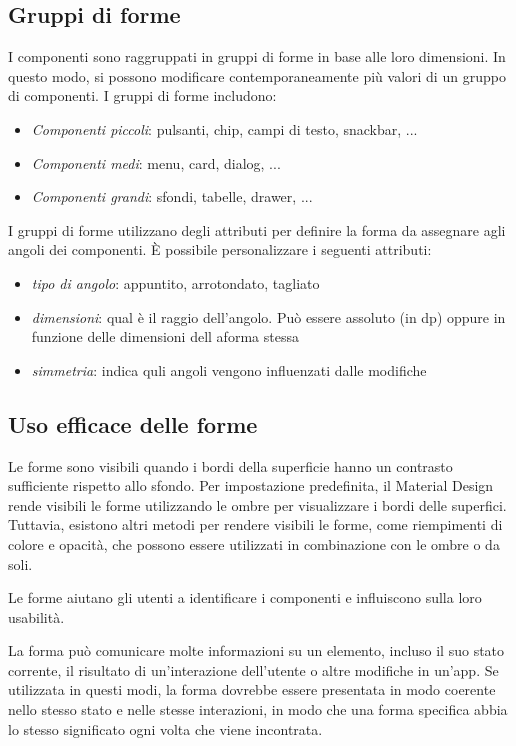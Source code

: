 \documentclass[12pt, a4paper]{report}
\begin{document}
	\subsection{Gruppi di forme}
	I componenti sono raggruppati in gruppi di forme in base alle loro dimensioni. In questo modo, si possono modificare contemporaneamente più valori di un gruppo di componenti. I gruppi di forme includono:
	\begin{itemize}
		\item \textit{Componenti piccoli}: pulsanti, chip, campi di testo, snackbar, ...
		\item \textit{Componenti medi}: menu, card, dialog, ...
		\item \textit{Componenti grandi}: sfondi, tabelle, drawer, ...
	\end{itemize}
	
	I gruppi di forme utilizzano degli attributi per definire la forma da assegnare agli angoli dei componenti. È possibile personalizzare i seguenti attributi:
	\begin{itemize}
		\item \textit{tipo di angolo}: appuntito, arrotondato, tagliato
		\item \textit{dimensioni}: qual è il raggio dell'angolo. Può essere assoluto (in dp) oppure in funzione delle dimensioni dell aforma stessa
		\item \textit{simmetria}: indica quli angoli vengono influenzati dalle modifiche
	\end{itemize}

	\subsection{Uso efficace delle forme}
	Le forme sono visibili quando i bordi della superficie hanno un contrasto sufficiente rispetto allo sfondo. Per impostazione predefinita, il Material Design rende visibili le forme utilizzando le ombre per visualizzare i bordi delle superfici.
	Tuttavia, esistono altri metodi per rendere visibili le forme, come riempimenti di colore e opacità, che possono essere utilizzati in combinazione con le ombre o da soli.

	Le forme aiutano gli utenti a identificare i componenti e influiscono sulla loro usabilità.

	La forma può comunicare molte informazioni su un elemento, incluso il suo stato corrente, il risultato di un'interazione dell'utente o altre modifiche in un'app. Se utilizzata in questi modi, la forma dovrebbe essere presentata in modo coerente
	nello stesso stato e nelle stesse interazioni, in modo che una forma specifica abbia lo stesso significato ogni volta che viene incontrata.
\end{document}
